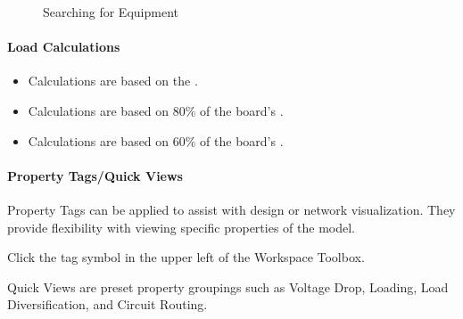 \documentclass[letterpaper,10pt,english]{sphinxmanual}
\begin{document}
\begin{figure}[H]
\centering
\capstart

\noindent{}
\caption{Searching for Equipment}\label{\detokenize{docs/userguide/buildingelectricalmodel/one-line/index-one-line:id18}}\end{figure}


\paragraph{Load Calculations}
\label{\detokenize{docs/userguide/buildingelectricalmodel/one-line/index-one-line:load-calculations}}\label{\detokenize{docs/userguide/buildingelectricalmodel/one-line/index-one-line:one-line-load-calculations}}\begin{itemize}
\item {} 
 Calculations are based on the {\hyperref[\detokenize{docs/faq:net-load}]{}}.

\item {} 
 Calculations are based on 80\% of the board’s {\hyperref[\detokenize{docs/faq:load-capacity}]{}}.

\item {} 
 Calculations are based on 60\% of the board’s {\hyperref[\detokenize{docs/faq:load-capacity}]{}}.

\end{itemize}


\paragraph{Property Tags/Quick Views}
\label{\detokenize{docs/userguide/buildingelectricalmodel/one-line/index-one-line:property-tags-quick-views}}\label{\detokenize{docs/userguide/buildingelectricalmodel/one-line/index-one-line:property-tags}}
Property Tags can be applied to assist with design or network visualization.  They provide flexibility with viewing specific properties of the model.

Click the tag symbol in the upper left of the Workspace Toolbox.

Quick Views are preset property groupings such as Voltage Drop, Loading, Load Diversification, and Circuit Routing.
\end{document}
